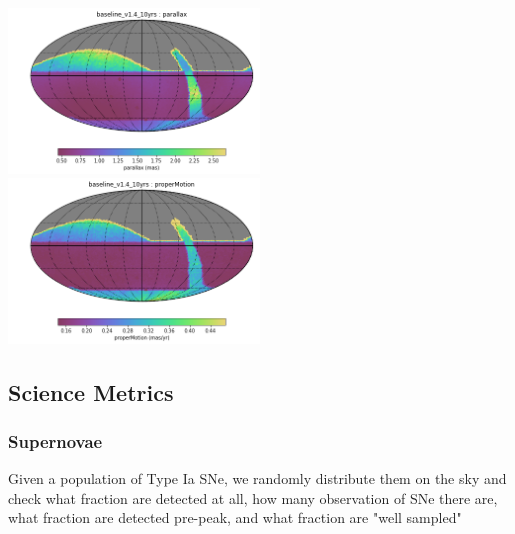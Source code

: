 \includegraphics[width=0.5\textwidth]{metric_summary/glance/thumb.baseline_v1_4_10yrs_parallax_HEAL_SkyMap.png}
\includegraphics[width=0.5\textwidth]{metric_summary/glance/thumb.baseline_v1_4_10yrs_properMotion_HEAL_SkyMap.png}

\subsection{Science Metrics}

\subsubsection{Supernovae}

Given a population of Type Ia SNe, we randomly distribute them on the sky and check what fraction are detected at all, how many observation of SNe there are, what fraction are detected pre-peak, and what fraction are "well sampled"

